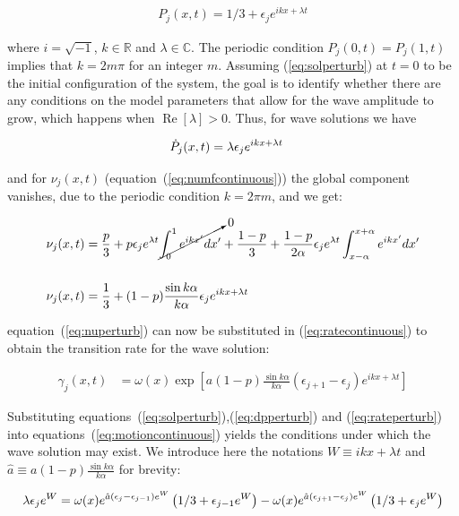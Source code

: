 \begin{align}
  P_j(x,t) = 1/3 + \epsilon_j e^{ikx + \lambda t}
  \label{eq:solperturb}
\end{align}

\noindent where $i=\sqrt{-1}$, $k\in\mathbb{R}$ and $\lambda\in\mathbb{C}$. The periodic condition $P_j(0,t) = P_j(1,t)$ implies that
$k=2m\pi$ for an integer $m$. Assuming (\ref{eq:solperturb}) at $t=0$ to be the initial configuration of the system, the goal is to
identify whether there are any conditions on the model parameters that allow for the wave amplitude to grow, which happens when
$\operatorname{Re}[\lambda]>0$. Thus, for wave solutions we have

\begin{align}
  \dot{P}_j(x,t) &= \lambda\epsilon_j e^{ikx + \lambda t}
  \label{eq:dpperturb}
\end{align}

\noindent and for $\nu_j(x,t)$ (equation~(\ref{eq:numfcontinuous})) the global component vanishes, due to the periodic condition
$k=2\pi m$, and we get:

\begin{align}
  \nu_j(x,t) &= \frac{p}{3} + p\epsilon_je^{\lambda t}\cancelto{0}{\int_0^1 e^{ikx'}dx'} +
  \frac{1-p}{3} + \frac{1-p}{2\alpha} \epsilon_je^{\lambda t}\int_{x-\alpha}^{x+\alpha}e^{ikx'}dx' \notag\\[14pt]
  \nu_j(x,t) &= \frac{1}{3} + (1-p)\frac{\sin k\alpha}{k\alpha}\epsilon_je^{ikx+\lambda t}
  \label{eq:nuperturb}
\end{align}

\noindent equation~(\ref{eq:nuperturb}) can now be substituted in (\ref{eq:ratecontinuous}) to obtain the transition rate for the wave
solution:

\begin{align}
  \gamma_j(x,t) &= \omega(x)\exp\left[ a(1-p)\frac{\sin k\alpha}{k\alpha}(\epsilon_{j+1}-\epsilon_j)e^{ikx+\lambda t} \right]
  \label{eq:rateperturb}
\end{align}

Substituting equations~(\ref{eq:solperturb}),(\ref{eq:dpperturb}) and (\ref{eq:rateperturb}) into equations~(\ref{eq:motioncontinuous})
yields the conditions under which the wave solution may exist. We introduce here the notations $W\equiv ikx + \lambda t$ and
$\hat{a}\equiv a(1-p)\frac{\sin k\alpha}{k\alpha}$ for brevity:

\begin{align}
  \lambda \epsilon_je^W = \omega(x)e^{\hat{a}(\epsilon_j-\epsilon_{j-1})e^W}\left(1/3+\epsilon_{j-1}e^W\right)
  - \omega(x)e^{\hat{a}(\epsilon_{j+1}-\epsilon_j)e^W}\left(1/3+\epsilon_je^W\right) \notag
\end{align}

